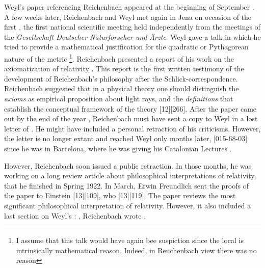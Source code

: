 \documentclass[draft]{article}
\begin{document}
Weyl's paper referencing Reichenbach appeared at the beginning of September \citep{Weyl1921e}. A few weeks later, Reichenbach and Weyl met again in Jena on occasion of the first  , the first national scientific meeting held independently from the meetings of the \textit{Gesellschaft Deutscher Naturforscher und Ärzte}. Weyl gave a talk in which he tried to provide a mathematical justification for the quadratic or Pythagorean nature of the metric \citep{Weyl1921f}\footnote{I assume that this talk would have again bee suspiction since the local is intrinsically mathematical reason. Indeed, in Reuchenbach view there was no reason}. Reichenbach presented a report of his work on the axiomatization of relativity \citep{Reichenbach1921d}. This report is the first written testimony of the development of Reichenbach's philosophy after the Schlick-correspondence. Reichenbach suggested that in a physical theory one should distinguish the \emph{axioms} as empirical proposition about light rays, \rac\etc and the \emph{definitions} that establish the conceptual framework of the theory [12][266]. After the paper came out by the end of the year \citep{Reichenbach1921d}, Reichenbach must have sent a copy to Weyl in a lost letter of . He might have included a personal retraction of his criticisms. However, the letter is no longer extant and reached Weyl only months later, [015-68-03] since he was in Barcelona, where he was giving his Catalonian Lectures \citep{Weyl1923}.

However, Reichenbach soon issued a public retraction. In those months, he was working on a long review article about philosophical interpretations of relativity, that he finished in Spring 1922. In March, Erwin Freundlich sent the proofs of the paper  to Einstein [13][109], who  [13][119]. The paper reviews the most significant philosophical interpretation of relativity. However, it also included a last section on Weyl's \uft: , Reichenbach wrote  \citep[365]{Reichenbach1922a}.
\end{document}

